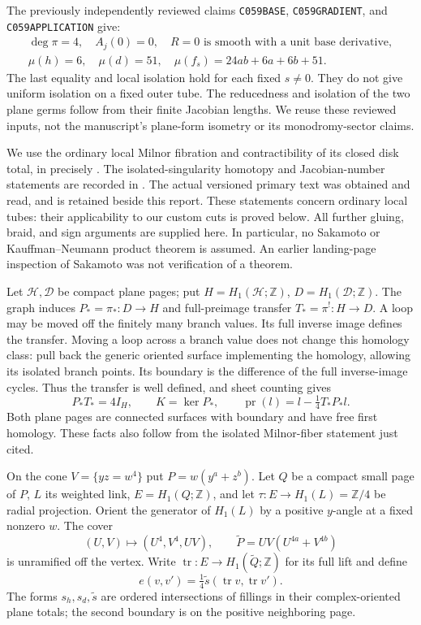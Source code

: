 \documentclass[11pt]{article}
\newcommand{\Z}{\mathbb Z}
\newcommand{\pr}{\operatorname{pr}}
\newcommand{\Tr}{\operatorname{tr}}
\newcommand{\calH}{\mathcal H}
\newcommand{\calD}{\mathcal D}
\begin{document}
The previously independently reviewed claims \texttt{C059BASE},
\texttt{C059GRADIENT}, and \texttt{C059APPLICATION} give:
\[
\begin{gathered}
\deg\pi=4,\quad A_j(0)=0,\quad
R=0\text{ is smooth with a unit base derivative},\\
\mu(h)=6,\quad\mu(d)=51,\quad
\mu(f_s)=24ab+6a+6b+51.
\end{gathered}                                      \tag{2}
\]
The last equality and local isolation hold for each fixed \(s\ne0\).
They do not give uniform isolation on a fixed outer tube.
The reducedness and isolation of the two plane germs follow from
their finite Jacobian lengths. We reuse these reviewed inputs,
not the manuscript's plane-form isometry or its monodromy-sector
claims.

We use the ordinary local Milnor fibration and contractibility of its
closed disk total, in precisely \cite[Theorem 1.8 and Remark 1.9]{Massey}.
The isolated-singularity homotopy and Jacobian-number statements are
recorded in \cite[Section 1, p.~6, items (2)--(5)]{Massey}.
The actual versioned primary text was obtained and read, and is retained
beside this report. These statements concern ordinary local tubes:
their applicability to our custom cuts is proved below.
All further gluing, braid, and sign arguments are supplied here.
In particular, no Sakamoto or Kauffman--Neumann product theorem is
assumed. An earlier landing-page inspection of Sakamoto was not
verification of a theorem.

Let \(\calH,\calD\) be compact plane pages; put
\(H=H_1(\calH;\Z)\), \(D=H_1(\calD;\Z)\).
The graph induces \(P_*=\pi_*:D\to H\) and full-preimage transfer
\(T_*=\pi^!:H\to D\). A loop may be moved off the finitely many
branch values. Its full inverse image defines the transfer.
Moving a loop across a branch value does not change this homology
class: pull back the generic oriented surface implementing the
homology, allowing its isolated branch points. Its boundary is
the difference of the full inverse-image cycles. Thus the transfer
is well defined, and sheet counting gives
\[
 P_*T_*=4I_H,\qquad K=\ker P_*,\qquad
 \pr(l)=l-\tfrac14T_*P_*l.                          \tag{3}
\]
Both plane pages are connected surfaces with boundary and have
free first homology. These facts also follow from the isolated
Milnor-fiber statement just cited.

On the cone \(V=\{yz=w^4\}\) put \(P=w(y^a+z^b)\).
Let \(Q\) be a compact small page of \(P\), \(L\) its weighted link,
\(E=H_1(Q;\Z)\), and let \(\tau:E\to H_1(L)=\Z/4\) be radial
projection. Orient the generator of \(H_1(L)\) by a positive
\(y\)-angle at a fixed nonzero \(w\).
The cover
\[
 (U,V)\longmapsto (U^4,V^4,UV),\qquad
 \widetilde P=UV(U^{4a}+V^{4b})
\]
is unramified off the vertex. Write
\(\Tr:E\to H_1(\widetilde Q;\Z)\) for its full lift and define
\[
 e(v,v')=\tfrac14\widetilde s(\Tr v,\Tr v').         \tag{4}
\]
The forms \(s_h,s_d,\widetilde s\) are ordered intersections of
fillings in their complex-oriented plane totals; the second
boundary is on the positive neighboring page.
\end{document}
